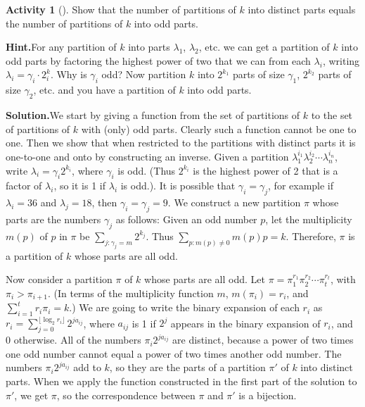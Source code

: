\documentclass[10pt,]{book}
\theoremstyle{plain}
\theoremstyle{definition}
\newtheorem{activity}[project]{Activity}
\numberwithin{equation}{chapter}
\begin{document}
\begin{activity}[]\label{activity-164}
Show that the number of partitions of \(k\) into distinct parts equals the number of partitions of \(k\) into odd parts.%
\par\medskip\noindent%
\textbf{Hint.}\quad For any partition of \(k\) into parts \(\lambda_1\), \(\lambda_2\), etc. we can get a partition of \(k\) into odd parts by factoring the highest power of two that we can from each \(\lambda_i\), writing \(\lambda_i = \gamma_i\cdot 2^k_i\).  Why is \(\gamma_i\) odd? Now partition \(k\) into \(2^{k_1}\) parts of size \(\gamma_1\), \(2^{k_2}\) parts of size \(\gamma_2\), etc. and you have a partition of \(k\) into odd parts.%
\par\medskip\noindent%
\textbf{Solution.}\quad We start by giving a function from the set of partitions of \(k\) to the set of partitions of \(k\) with (only) odd parts. Clearly such a function cannot be one to one. Then we show that when restricted to the partitions with distinct parts it is one-to-one and onto by constructing an inverse. Given a partition \(\lambda_1^{i_1}\lambda_2^{i_2}\cdots\lambda_n^{i_n}\), write \(\lambda_i=\gamma_i2^{k_i}\), where \(\gamma_i\) is odd. (Thus \(2^{k_i}\) is the highest power of 2 that is a factor of \(\lambda_i\), so it is 1 if \(\lambda_i\) is odd.). It is possible that \(\gamma_i=\gamma_j\), for example if \(\lambda_i=36\) and \(\lambda_j=18\), then \(\gamma_i=\gamma_j=9\). We construct a new partition \(\pi\) whose parts are the numbers \(\gamma_j\) as follows: Given an odd number \(p\), let the multiplicity \(m(p)\) of \(p\) in \(\pi\) be \(\sum_{j: \gamma_j=m} 2^{k_j}\). Thus \(\sum_{p: m(p)\not=0}m(p)p = k\). Therefore, \(\pi\) is a partition of \(k\) whose parts are all odd.%
\par
Now consider a partition \(\pi\) of \(k\) whose parts are all odd. Let \(\pi=\pi_1^{r_1}\pi_2^{r_2}\cdots \pi_t^{r_t}\), with \(\pi_i>\pi_{i+1}\). (In terms of the multiplicity function \(m\), \(m(\pi_i) =r_i\), and \(\sum_{i=1}^t r_i\pi_i = k\).) We are going to write the binary expansion of each \(r_i\) as \(r_i = \sum_{j= 0}^{\lfloor \log_2 r_i\rfloor} 2^{ja_{ij}}\), where \(a_{ij}\) is 1 if \(2^j\) appears in the binary expansion of \(r_i\), and 0 otherwise. All of the numbers \(\pi_i2^{ja_{ij}}\) are distinct, because a power of two times one odd number cannot equal a power of two times another odd number. The numbers \(\pi_i2^{ja_{ij}}\) add to \(k\), so they are the parts of a partition \(\pi'\) of \(k\) into distinct parts. When we apply the function constructed in the first part of the solution to \(\pi'\), we get \(\pi\), so the correspondence between \(\pi\) and \(\pi'\) is a bijection.%
\end{activity}
\end{document}
